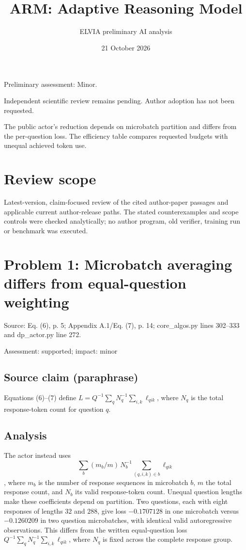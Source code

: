 \documentclass[11pt]{article}
\begin{document}
\title{ARM: Adaptive Reasoning Model}

\author{ELVIA preliminary AI analysis}\date{21 October 2026}\maketitle

Preliminary assessment: Minor.\par

Independent scientific review remains pending. Author adoption has not been requested.

The public actor’s reduction depends on microbatch partition and differs from the per-question loss. The efficiency table compares requested budgets with unequal achieved token use.

\section*{Review scope}

Latest-version, claim-focused review of the cited author-paper passages and applicable current author-release paths. The stated counterexamples and scope controls were checked analytically; no author program, old verifier, training run or benchmark was executed.

\section*{Problem 1: Microbatch averaging differs from equal-question weighting}

Source: Eq. (6), p. 5; Appendix A.1/Eq. (7), p. 14; core\_algos.py lines 302–333 and dp\_actor.py line 272.

Assessment: supported; impact: minor

\subsection*{Source claim (paraphrase)}

Equations (6)–(7) define \(L=Q^{-1}\sum_qN_q^{-1}\sum_{i,k}\ell_{qik}\), where \(N_q\) is the total response-token count for question \(q\).

\subsection*{Analysis}

The actor instead uses \[\sum_b(m_b/m)\,N_b^{-1}\sum_{(q,i,k)\in b}\ell_{qik}\], where \(m_b\) is the number of response sequences in microbatch \(b\), \(m\) the total response count, and \(N_b\) its valid response-token count. Unequal question lengths make these coefficients depend on partition. Two questions, each with eight responses of lengths \(32\) and \(288\), give loss \(-0.1707128\) in one microbatch versus \(-0.1260209\) in two question microbatches, with identical valid autoregressive observations. This differs from the written equal-question loss \(Q^{-1}\sum_qN_q^{-1}\sum_{i,k}\ell_{qik}\), where \(N_q\) is fixed across the complete response group.
\end{document}
